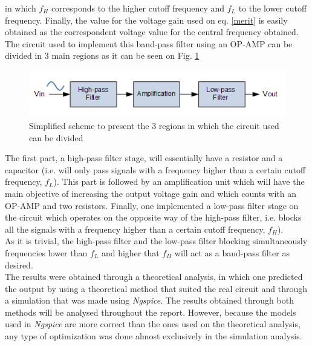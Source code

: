 in which $f_H$ corresponds to the higher cutoff frequency and $f_L$ to the lower cutoff frequency. Finally, the value for the voltage gain used on eq. \eqref{merit} is easily obtained as the correspondent voltage value for the central frequency obtained. \\

The circuit used to implement this band-pass filter using an OP-AMP can be divided in 3 main regions as it can be seen on Fig. \ref{initialscheme}

\begin{figure}[H]
    \centering
    \includegraphics{esquemabunituh.PNG}
    \caption{Simplified scheme to present the 3 regions in which the circuit used can be divided}
    \label{initialscheme}
\end{figure}

The first part, a high-pass filter stage, will essentially have a resistor and a capacitor (i.e. will only pass signals with a frequency higher than a certain cutoff frequency, $f_L$). This part is followed by an amplification unit which will have the main objective of increasing the output voltage gain and which counts with an OP-AMP and two resistors. Finally, one implemented a low-pass filter stage on the circuit which operates on the opposite way of the high-pass filter, i.e. blocks all the signals with a frequency higher than a certain cutoff frequency, $f_H$). \\

As it is trivial, the high-pass filter and the low-pass filter blocking simultaneously frequencies lower than $f_L$ and higher that $f_H$ will act as a band-pass filter as desired. \\

The results were obtained through a theoretical analysis, in which one predicted the output by using a theoretical method that suited the real circuit and through a simulation that was made using \textit{Ngspice}. The results obtained through both methods will be analysed throughout the report. However, because the models used in \textit{Ngspice} are more correct than the ones used on the theoretical analysis, any type of optimization was done almost exclusively in the simulation analysis.\\